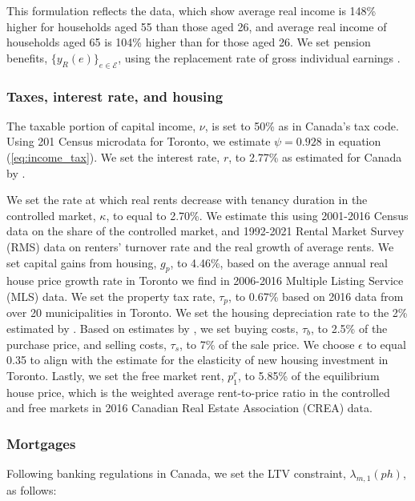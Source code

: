\documentclass[parskip=full]{article}
\begin{document}
\noindent This formulation reflects the data, which show average real income is 148\% higher for households aged 55 than those aged 26, and average real income of households aged 65 is 104\% higher than for those aged 26. We set pension benefits, $\{y_{R}(e)\}_{e\in \mathcal{E}}$, using the replacement rate of gross individual earnings \citep{OECD-pension}.

\subsubsection{Taxes, interest rate, and housing}

The taxable portion of capital income, $\nu$, is set to 50\% as in Canada's tax code. Using 201 Census microdata for Toronto, we estimate $\psi=0.928$ in equation (\ref{eq:income_tax}). We set the interest rate, $r$, to 2.77\% as estimated for Canada by \citet{bruneau-etal-2018}. 

We set the rate at which real rents decrease with tenancy duration in the controlled market, $\kappa$, to equal to 2.70\%. We estimate this using 2001-2016 Census data on the share of the controlled market, and 1992-2021 Rental Market Survey (RMS) data on renters' turnover rate and the real growth of average rents. We set capital gains from housing, $g_{p}$, to 4.46\%, based on the average annual real house price growth rate in Toronto we find in 2006-2016 Multiple Listing Service (MLS) data. We set the property tax rate, $\tau_p$, to 0.67\% based on 2016 data from over 20 municipalities in Toronto. We set the housing depreciation rate to the 2\% estimated by \citet{hardingetal-2007}. Based on estimates by \citet{gm-2003}, we set buying costs, $\tau_{b}$, to 2.5\% of the purchase price, and selling costs, $\tau_{s}$, to 7\% of the sale price. We choose $\epsilon$ to equal 0.35 to align with the \citet{cmhc-report-2018} estimate for the elasticity of new housing investment in Toronto. Lastly, we set the free market rent, $p^{r}_{1}$, to 5.85\% of the equilibrium house price, which is the weighted average rent-to-price ratio in the controlled and free markets in 2016 Canadian Real Estate Association (CREA) data.

\subsubsection{Mortgages}

Following banking regulations in Canada, we set the LTV constraint, $\lambda_{m,1}(ph)$, as follows:
\end{document}
